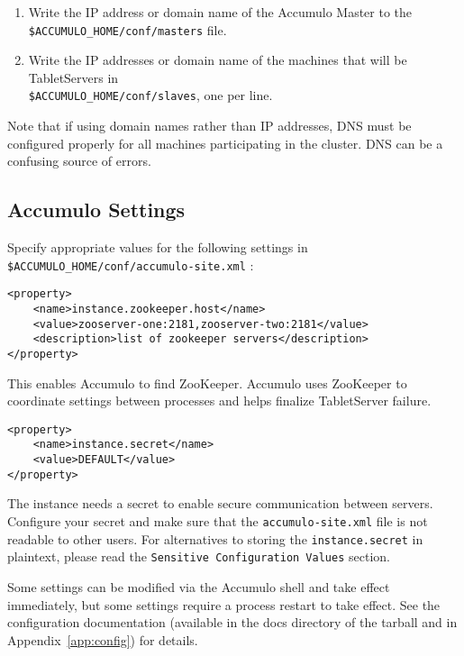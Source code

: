 \begin{enumerate}
\item{Write the IP address or domain name of the Accumulo Master to the\\\texttt{\$ACCUMULO\_HOME/conf/masters} file.}
\item{Write the IP addresses or domain name of the machines that will be TabletServers in\\\texttt{\$ACCUMULO\_HOME/conf/slaves}, one per line.}
\end{enumerate}

Note that if using domain names rather than IP addresses, DNS must be configured
properly for all machines participating in the cluster. DNS can be a confusing source
of errors.

\subsection{Accumulo Settings}
Specify appropriate values for the following settings in\\
\texttt{\$ACCUMULO\_HOME/conf/accumulo-site.xml} :

\begingroup\fontsize{8pt}{8pt}\selectfont\begin{verbatim}
<property>
    <name>instance.zookeeper.host</name>
    <value>zooserver-one:2181,zooserver-two:2181</value>
    <description>list of zookeeper servers</description>
</property>
\end{verbatim}\endgroup

This enables Accumulo to find ZooKeeper. Accumulo uses ZooKeeper to coordinate
settings between processes and helps finalize TabletServer failure.


\begingroup\fontsize{8pt}{8pt}\selectfont\begin{verbatim}
<property>
    <name>instance.secret</name>
    <value>DEFAULT</value>
</property>
\end{verbatim}\endgroup

The instance needs a secret to enable secure communication between servers. Configure your
secret and make sure that the \texttt{accumulo-site.xml} file is not readable to other users.
For alternatives to storing the \texttt{instance.secret} in plaintext, please read the
\texttt{Sensitive Configuration Values} section.

Some settings can be modified via the Accumulo shell and take effect immediately, but
some settings require a process restart to take effect. See the configuration documentation
(available in the docs directory of the tarball and in Appendix~\ref{app:config}) for details.


